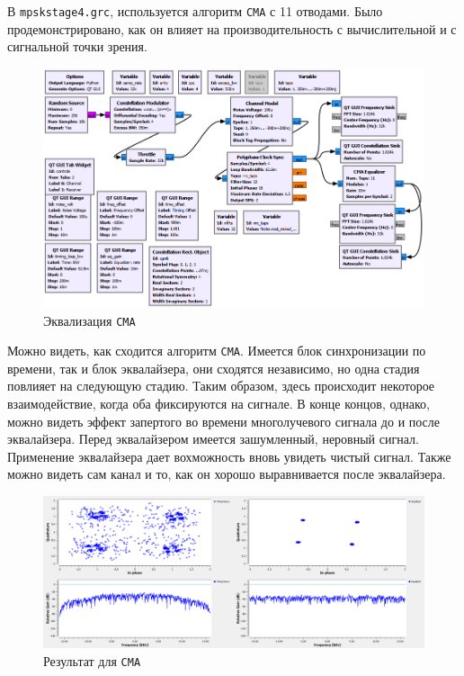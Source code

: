\documentclass[a4paper]{article}
\begin{document}
            В  \texttt{mpskstage4.grc}, используется алгоритм  \texttt{CMA} с 11 отводами. Было продемонстрировано, как он влияет на производительность с вычислительной и с сигнальной точки зрения.
            
            \begin{figure}[H]
                \centering
                \includegraphics[width=\textwidth]{ex_6_1.png}
                \caption{Эквализация \texttt{CMA}}
                \label{fig:ex_6_1}
            \end{figure}
            
            Можно видеть, как сходится алгоритм \texttt{CMA}. Имеется блок синхронизации по времени, так и блок эквалайзера, они сходятся независимо, но одна стадия повлияет на следующую стадию. Таким образом, здесь происходит некоторое взаимодействие, когда оба фиксируются на сигнале. В конце концов, однако, можно видеть эффект запертого во времени многолучевого сигнала до и после эквалайзера. Перед эквалайзером имеется зашумленный, неровный сигнал. Применение эквалайзера дает вохможность вновь увидеть чистый сигнал. Также можно видеть сам канал и то, как он хорошо выравнивается после эквалайзера.
            
            \begin{figure}[H]
                \centering
                \includegraphics[width=\textwidth]{ex_6_2.png}
                \caption{Результат для \texttt{CMA}}
                \label{fig:ex_6_2}
            \end{figure}
            
\end{document}

